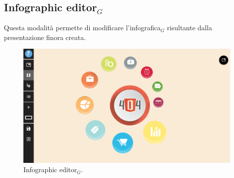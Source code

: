 \subsection{Infographic editor$_G$}
Questa modalità permette di modificare l'infografica$_G$ risultante dalla presentazione finora creata.
\begin{figure}[!h]
\begin{center}
\includegraphics[scale=0.35]{img/infographic.png}
\caption{Infographic editor$_G$.}
\end{center}
\end{figure}

